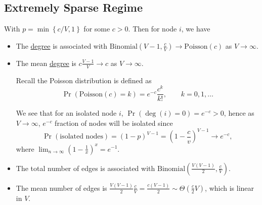 \subsection{Extremely Sparse Regime}\label{subsec:extremely-sparse-regime}
With \(p = \min\left\{c / V, 1\right\}\) for some \(c>0\). Then for node \(i\), we have
\begin{itemize}
	\item The \hyperref[def:degree]{degree} is associated with \(\mathrm{Binomial}(V - 1, \frac{c}{V}) \to \mathrm{Poisson}(c) \) as \(V\to \infty \).
	\item The mean \hyperref[def:degree]{degree} is \(c \frac{V-1}{V}\to c\) as \(V\to \infty.\)
	      \begin{note}
		      Recall the Poisson distribution is defined as
		      \[
			      \Pr( \mathrm{Poisson}(c)=k ) = e^{-c} \frac{c^k}{k!}, \qquad k = 0, 1, \dots
		      \]
	      \end{note}
	      We see that for an isolated node \(i\), \(\Pr( \deg(i) =0) = e^{-c} > 0\), hence as \(V\to \infty \), \(e^{-c}\) fraction of nodes will be isolated since
	      \[
		      \Pr( \text{isolated nodes}) = (1 - p)^{V - 1} = \left(1 - \frac{c}{v}\right)^{V-1} \to e^{-c},
	      \]
	      where \(\lim_{n \to \infty} \left(1 - \frac{1}{x}\right)^x = e^{-1}\).
	\item The total number of edges is associated with \(\mathrm{Binomial}\left(\frac{V(V-1)}{2}, \frac{c}{V}\right)\).
	\item The mean number of edges is \(\frac{V(V - 1)}{2}\frac{c}{V} = \frac{c(V - 1)}{2}\sim \Theta(\frac{c}{2}V)\), which is linear in \(V\).
\end{itemize}

